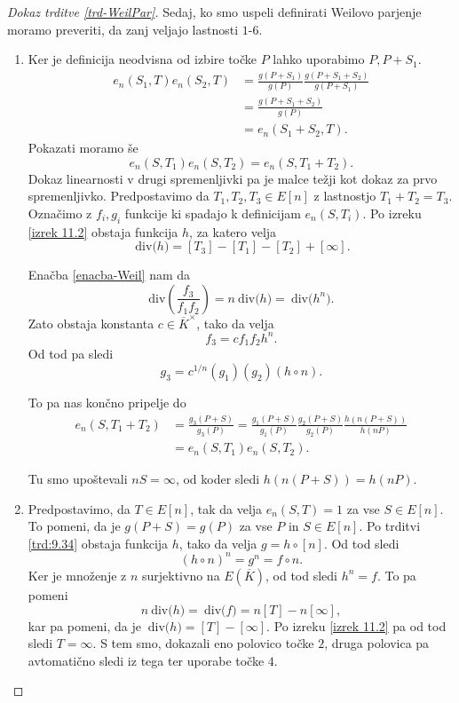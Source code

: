 \documentclass[12pt,a4paper,twoside]{article}
\theoremstyle{definition} %
\theoremstyle{plain} %
\numberwithin{equation}{section}  %
\newcommand{\Div}[1]{\ \text{div(}{#1}\text{)}}
\begin{document}
\begin{proof}[Dokaz trditve \ref{trd-WeilPar}]
Sedaj, ko smo uspeli definirati Weilovo parjenje moramo preveriti, da zanj veljajo lastnosti $1$-$6$.
\begin{enumerate}
\item Ker je definicija neodvisna od izbire točke $P$ lahko uporabimo $P,P+S_1$.
\begin{align}
e_n(S_1,T)e_n(S_2,T) &{}= \frac{g(P+S_1)}{g(P)} \frac{g(P+S_1+S_2)}{g(P+S_1)} \nonumber \\
&{} = \frac{g(P+S_1+S_2)}{g(P)} \nonumber \\
&{} = e_n(S_1+S_2,T). \nonumber
\end{align}
Pokazati moramo še
$$e_n(S,T_1)e_n(S,T_2) = e_n(S,T_1+T_2).$$
Dokaz linearnosti v drugi spremenljivki pa je malce težji kot dokaz za prvo spremenljivko.
Predpostavimo da $T_1,T_2,T_3 \in E[n]$ z lastnostjo $T_1 +T_2 = T_3.$ Označimo z $f_i,g_i$ funkcije ki spadajo k definicijam $e_n(S,T_i)$.
Po izreku \ref{izrek 11.2} obstaja funkcija $h$, za katero velja
$$\Div{h} = [T_3]-[T_1]-[T_2] + [\infty].$$

Enačba \ref{enacba-Weil} nam da
$$\text{div} \left(  \frac{f_3}{f_1f_2}\right) = n \Div{h} = \Div{h^n}.$$
Zato obstaja konstanta $c \in \overline{K}^{\times}$, tako da velja
$$f_3 = cf_1f_2h^n.$$
Od tod pa sledi
$$g_3 = c^{1/n}(g_1)(g_2)(h \circ n).$$

To pa nas končno pripelje do
\begin{align}
e_n(S,T_1+T_2) &{}= \frac{g_3(P+S)}{g_3(P)} = \frac{g_1(P+S)}{g_1(P)} \frac{g_2(P+S)}{g_2(P)} \frac{h(n(P+S))}{h(nP)} \nonumber \\
&{} = e_n(S,T_1)e_n(S,T_2). \nonumber
\end{align}

Tu smo upoštevali $nS = \infty$, od koder sledi $h(n(P+S)) = h(nP)$.

\item Predpostavimo, da $T \in E[n]$, tak da velja $e_n(S,T)=1$ za vse $S \in E[n]$. To pomeni, da je $g(P+S) = g(P)$ za vse $P$ in $S \in E[n]$. Po trditvi \ref{trd:9.34} %
obstaja funkcija $h$, tako da velja $g = h \circ [n]$. Od tod sledi 
$$(h \circ n) ^n = g^n = f \circ n.$$
Ker je množenje z $n$ surjektivno na $E(\overline{K})$, od tod sledi $h^n = f$. %
To pa pomeni
$$n\Div{h} = \Div{f} = n[T]-n[\infty],$$
kar pa pomeni, da je $\Div{h} = [T] - [\infty]$. Po izreku \ref{izrek 11.2} pa od tod sledi $T = \infty$. S tem smo, dokazali eno polovico točke $2$, druga polovica pa avtomatično sledi iz tega ter uporabe točke $4$.


\end{enumerate}
\end{proof}
\end{document}
